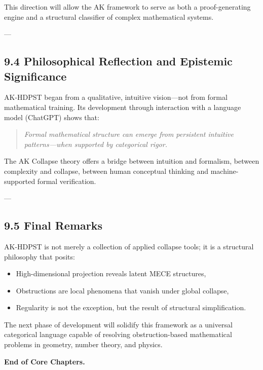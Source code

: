 \documentclass[11pt]{article}
\begin{document}
This direction will allow the AK framework to serve as both a proof-generating engine and a structural classifier of complex mathematical systems.

---

\subsection*{9.4 Philosophical Reflection and Epistemic Significance}

AK-HDPST began from a qualitative, intuitive vision—not from formal mathematical training.  
Its development through interaction with a language model (ChatGPT) shows that:

\begin{quote}
\textit{Formal mathematical structure can emerge from persistent intuitive patterns—when supported by categorical rigor.}
\end{quote}

The AK Collapse theory offers a bridge between intuition and formalism, between complexity and collapse,  
between human conceptual thinking and machine-supported formal verification.

---

\subsection*{9.5 Final Remarks}

AK-HDPST is not merely a collection of applied collapse tools; it is a structural philosophy that posits:

\begin{itemize}
  \item High-dimensional projection reveals latent MECE structures,
  \item Obstructions are local phenomena that vanish under global collapse,
  \item Regularity is not the exception, but the result of structural simplification.
\end{itemize}

The next phase of development will solidify this framework as a universal categorical language  
capable of resolving obstruction-based mathematical problems in geometry, number theory, and physics.

\vspace{1em}
\noindent\textbf{End of Core Chapters.}





\appendix
\end{document}
